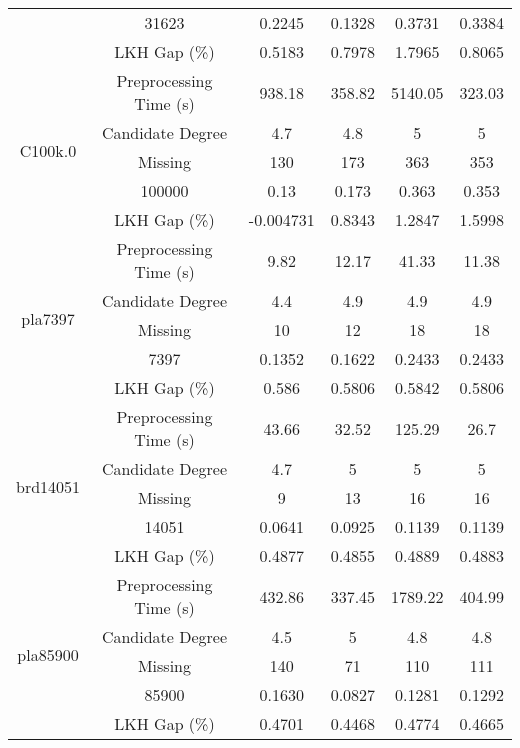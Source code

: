 \begin{table}[htbp]
\begin{tabular}{cccccc}
            & 31623 & 0.2245  & 0.1328  & 0.3731  & 0.3384  \\
            & LKH Gap (\%) & 0.5183 & 0.7978 & 1.7965 & 0.8065 \\
      \midrule
      \multirow{5}[2]{*}{C100k.0} & Preprocessing Time (s) & 938.18 & 358.82 & 5140.05 & 323.03 \\
            & Candidate Degree & 4.7   & 4.8   & 5     & 5 \\
            & Missing & 130   & 173   & 363   & 353 \\
            & 100000 & 0.13  & 0.173 & 0.363 & 0.353 \\
            & LKH Gap (\%) & -0.004731 & 0.8343 & 1.2847 & 1.5998 \\
      \midrule
      \multirow{5}[2]{*}{pla7397} & Preprocessing Time (s) & 9.82  & 12.17 & 41.33 & 11.38 \\
            & Candidate Degree & 4.4   & 4.9   & 4.9   & 4.9 \\
            & Missing & 10    & 12    & 18    & 18 \\
            & 7397  & 0.1352  & 0.1622  & 0.2433  & 0.2433  \\
            & LKH Gap (\%) & 0.586 & 0.5806 & 0.5842 & 0.5806 \\
      \midrule
      \multirow{5}[2]{*}{brd14051} & Preprocessing Time (s) & 43.66 & 32.52 & 125.29 & 26.7 \\
            & Candidate Degree & 4.7   & 5     & 5     & 5 \\
            & Missing & 9     & 13    & 16    & 16 \\
            & 14051 & 0.0641  & 0.0925  & 0.1139  & 0.1139  \\
            & LKH Gap (\%) & 0.4877 & 0.4855 & 0.4889 & 0.4883 \\
      \midrule
      \multirow{5}[2]{*}{pla85900} & Preprocessing Time (s) & 432.86 & 337.45 & 1789.22 & 404.99 \\
            & Candidate Degree & 4.5   & 5     & 4.8   & 4.8 \\
            & Missing & 140   & 71    & 110   & 111 \\
            & 85900 & 0.1630  & 0.0827  & 0.1281  & 0.1292  \\
            & LKH Gap (\%) & 0.4701 & 0.4468 & 0.4774 & 0.4665 \\
      \bottomrule
      \end{tabular}%
    \label{tab:addlabel}%
\end{table}%
  

